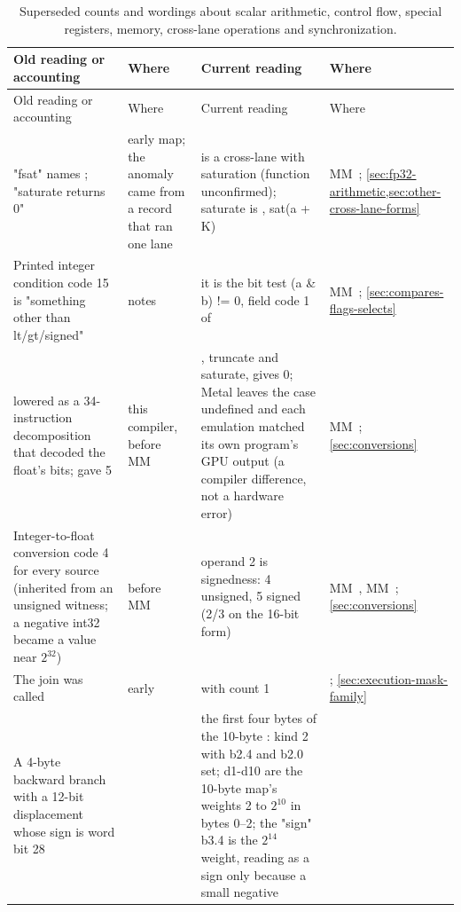 \begin{xltabular}{\linewidth}{@{}>{\hsize}X>{\hsize}X>{\hsize}X>{\hsize}X@{}}
\caption{Superseded counts and wordings about scalar arithmetic, control flow, special registers, memory, cross-lane operations and synchronization.}\label{tab:acct-scalar-memory}\\
\toprule
Old reading or accounting & Where & Current reading & Where \\
\midrule
\endfirsthead
{}
\toprule
Old reading or accounting & Where & Current reading & Where \\
\midrule
\endhead
"fsat" names ; "saturate returns
0" & early map; the anomaly came from a record that ran one lane &  is a cross-lane  with saturation (function
unconfirmed); saturate is , sat(a + K) & MM~; \cref{sec:fp32-arithmetic,sec:other-cross-lane-forms} \\
Printed integer condition code 15 is "something other than lt/gt/signed" &  notes & it is the bit test (a \& b) != 0, field code 1 of  & MM~; \cref{sec:compares-flags-selects} \\
 lowered as a 34-instruction decomposition that decoded
the float's bits;  gave 5 & this compiler, before MM~ & , truncate and saturate, gives 0;
Metal leaves the case undefined and each emulation matched its own
program's GPU output (a compiler difference, not a
hardware error) & MM~; \cref{sec:conversions} \\
Integer-to-float conversion code 4 for every source (inherited from an
unsigned witness; a negative int32 became a value near $2^{32}$) &  before MM~ & operand 2 is signedness: 4 unsigned, 5 signed (2/3 on the 16-bit form) & MM~, MM~; \cref{sec:conversions} \\
The join was called  & early  &  with count 1 & ; \cref{sec:execution-mask-family} \\
A 4-byte backward branch  with a 12-bit displacement
whose sign is word bit 28 &  & the first four bytes of the 10-byte : kind 2 with b2.4 and b2.0 set; d1-d10 are the 10-byte
map's weights 2 to $2^{10}$ in bytes 0–2; the "sign" b3.4
is the $2^{14}$ weight, reading as a sign only because a small negative

\end{xltabular}
